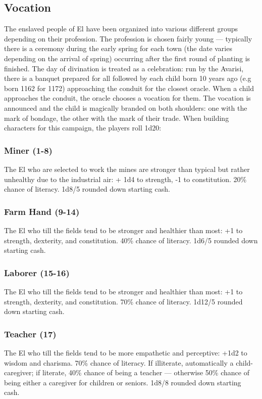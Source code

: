 \documentclass[letterpaper,12pt]{article}
\begin{document}
\subsection{Vocation}

The enslaved people of El have been organized into various different groups depending on their profession. The profession is chosen fairly young --- typically there is a ceremony during the early spring for each town (the date varies depending on the arrival of spring) occurring after the first round of planting is finished. The day of divination is treated as a celebration: run by the Avarisi, there is a banquet prepared for all followed by each child born 10 years ago (e.g born 1162 for 1172) approaching the conduit for the closest oracle. When a child approaches the conduit, the oracle chooses a vocation for them. The vocation is announced and the child is magically branded on both shoulders: one with the mark of bondage, the other with the mark of their trade. When building characters for this campaign, the players roll 1d20:

\subsubsection{Miner (1-8)}
The El who are selected to work the mines are stronger than typical but rather unhealthy due to the industrial air: + 1d4 to strength, -1 to constitution. 20\% chance of literacy. 1d8/5 rounded down starting cash.

\subsubsection{Farm Hand (9-14)}
The El who till the fields tend to be stronger and healthier than most: +1 to strength, dexterity, and constitution. 40\% chance of literacy. 1d6/5 rounded down starting cash.

\subsubsection{Laborer (15-16)}
The El who till the fields tend to be stronger and healthier than most: +1 to strength, dexterity, and constitution. 70\% chance of literacy. 1d12/5 rounded down starting cash.

\subsubsection{Teacher (17)}
The El who till the fields tend to be more empathetic and perceptive: +1d2 to wisdom and charisma. 70\% chance of literacy. If illiterate, automatically a child-caregiver; if literate, 40\% chance of being a teacher --- otherwise 50\% chance of being either a caregiver for children or seniors. 1d8/8 rounded down starting cash.
\end{document}
